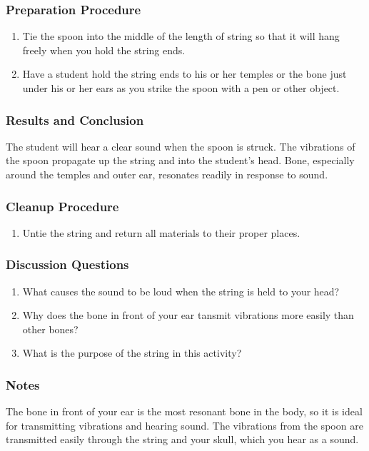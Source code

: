 \subsubsection*{Preparation Procedure}
\begin{enumerate}
\item{Tie the spoon into the middle of the length of string so that it will hang freely when you hold the string ends.}
\item{Have a student hold the string ends to his or her temples or the bone just under his or her ears as you strike the spoon with a pen or other object.}
\end{enumerate}

\subsubsection*{Results and Conclusion}
The student will hear a clear sound when the spoon is struck.  The vibrations of the spoon propagate up the string and into
the student's head. Bone, especially around the temples and outer ear, resonates readily in response to sound.

\subsubsection*{Cleanup Procedure}
\begin{enumerate}
\item{Untie the string and return all materials to their proper places.}
\end{enumerate}

\subsubsection*{Discussion Questions}
\begin{enumerate}
\item{What causes the sound to be loud when the string is held to your head?}
\item{Why does the bone in front of your ear tansmit vibrations more easily than other bones?}
\item{What is the purpose of the string in this activity?}
\end{enumerate}

\subsubsection*{Notes}
The bone in front of your ear is the most resonant bone in the body, so it is ideal for transmitting vibrations and hearing sound.  The vibrations from the spoon are transmitted easily through the string and your skull, which you hear as a sound.

